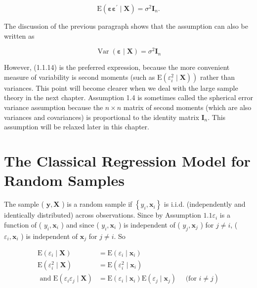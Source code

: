 \documentclass[10pt]{article}
\begin{document}
\begin{equation*}
\mathrm{E}\left(\boldsymbol{\varepsilon} \boldsymbol{\varepsilon}^{\prime} \mid \mathbf{X}\right)=\sigma^{2} \mathbf{I}_{n} . \tag{1.1.14}
\end{equation*}


The discussion of the previous paragraph shows that the assumption can also be written as

$$
\operatorname{Var}(\boldsymbol{\varepsilon} \mid \mathbf{X})=\sigma^{2} \mathbf{I}_{n}
$$

However, (1.1.14) is the preferred expression, because the more convenient measure of variability is second moments (such as $\left.\mathrm{E}\left(\varepsilon_{i}^{2} \mid \mathbf{X}\right)\right)$ rather than variances. This point will become clearer when we deal with the large sample theory in the next chapter. Assumption 1.4 is sometimes called the spherical error variance assumption because the $n \times n$ matrix of second moments (which are also variances and covariances) is proportional to the identity matrix $\mathbf{I}_{n}$. This assumption will be relaxed later in this chapter.

\section*{The Classical Regression Model for Random Samples}
The sample ( $\mathbf{y}, \mathbf{X}$ ) is a random sample if $\left\{y_{i}, \mathbf{x}_{i}\right\}$ is i.i.d. (independently and identically distributed) across observations. Since by Assumption $1.1 \varepsilon_{i}$ is a function of ( $y_{i}, \mathbf{x}_{i}$ ) and since ( $y_{i}, \mathbf{x}_{i}$ ) is independent of ( $y_{j}, \mathbf{x}_{j}$ ) for $j \neq i$, ( $\varepsilon_{i}, \mathbf{x}_{i}$ ) is independent of $\mathbf{x}_{j}$ for $j \neq i$. So


\begin{align*}
\mathrm{E}\left(\varepsilon_{i} \mid \mathbf{X}\right) & =\mathrm{E}\left(\varepsilon_{i} \mid \mathbf{x}_{i}\right) \\
\mathrm{E}\left(\varepsilon_{i}^{2} \mid \mathbf{X}\right) & =\mathrm{E}\left(\varepsilon_{i}^{2} \mid \mathbf{x}_{i}\right) \\
\text { and } \mathrm{E}\left(\varepsilon_{i} \varepsilon_{j} \mid \mathbf{X}\right) & \left.=\mathrm{E}\left(\varepsilon_{i} \mid \mathbf{x}_{i}\right) \mathrm{E}\left(\varepsilon_{j} \mid \mathbf{x}_{j}\right) \quad \text { (for } i \neq j\right) \tag{1.1.15}
\end{align*}
\end{document}
